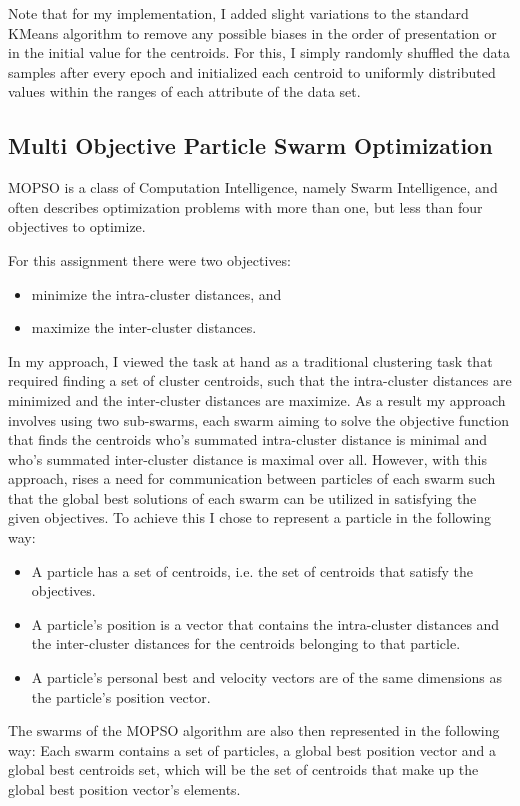 \begin{flushleft}
        Note that for my implementation, I added slight variations to the standard KMeans algorithm to remove
        any possible biases in the order of presentation or in the initial value for the centroids. 
        For this, I simply randomly shuffled the data samples after every epoch and initialized each centroid to 
        uniformly distributed values within the ranges of each attribute of the data set.

    \subsection{Multi Objective Particle Swarm Optimization}
        MOPSO is a class of Computation Intelligence, namely Swarm Intelligence, and often describes optimization 
        problems with more than one, but less than four objectives to optimize.

        For this assignment there were two objectives:
        \begin{itemize}
            \item minimize the intra-cluster distances, and
            \item maximize the inter-cluster distances.
        \end{itemize}

        In my approach, I viewed the task at hand as a traditional clustering task that required finding a set of cluster centroids, 
        such that the intra-cluster distances are minimized and the inter-cluster distances are maximize. As a result my approach 
        involves using two sub-swarms, each swarm aiming to solve the objective function that finds the centroids who's summated 
        intra-cluster distance is minimal and who's summated inter-cluster distance is maximal over all. However, with this approach, 
        rises a need for communication between particles of each swarm such that the global best solutions of each swarm 
        can be utilized in satisfying the given objectives. To achieve this I chose to represent a particle in the following way: \\
        \begin{itemize}
            \item A particle has a set of centroids, i.e. the set of centroids that satisfy the objectives.
            \item A particle's position is a vector that contains the intra-cluster distances and the inter-cluster distances for the 
            centroids belonging to that particle.
            \item A particle's personal best and velocity vectors are of the same dimensions as the particle's position vector.
        \end{itemize}
        The swarms of the MOPSO algorithm are also then represented in the following way: Each swarm contains a set of particles, 
        a global best position vector and a global best centroids set, which will be the set of centroids that make up the global 
        best position vector's elements.


\end{flushleft}
